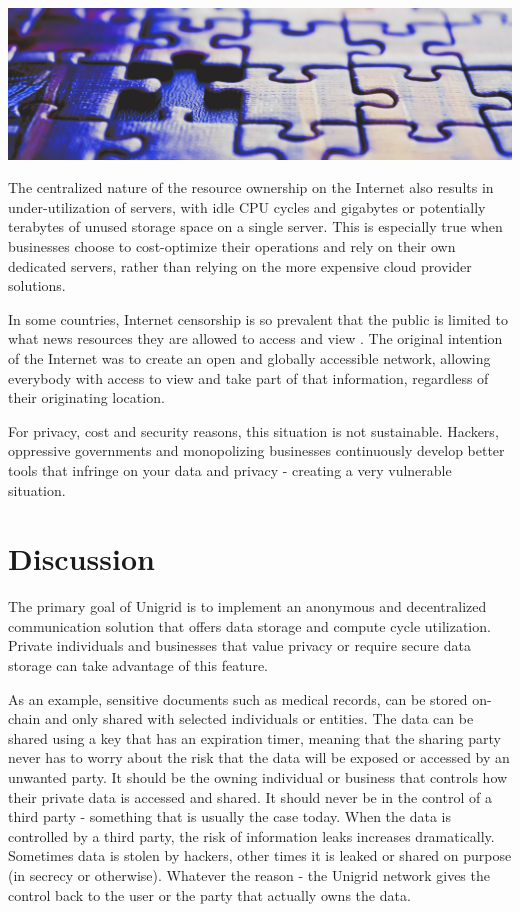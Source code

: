 \documentclass[a4paper,oneside]{article}
\begin{document}
\vspace{0.05cm}
\begin{mdframed}[style=textimage]
	\includegraphics[width=381pt]{puzzle}
\end{mdframed}

\noindent The centralized nature of the resource ownership on the Internet also results in under-utilization of servers, with idle CPU cycles and gigabytes or potentially terabytes of unused storage space on a single server. This is especially true when businesses choose to cost-optimize their operations and rely on their own dedicated servers, rather than relying on the more expensive cloud provider solutions.

In some countries, Internet censorship is so prevalent that the public is limited to what news resources they are allowed to access and view \cite{wiki2021}. The original intention of the Internet was to create an open and globally accessible network, allowing everybody with access to view and take part of that information, regardless of their originating location.

For privacy, cost and security reasons, this situation is not sustainable. Hackers, oppressive governments and monopolizing businesses continuously develop better tools that infringe on your data and privacy - creating a very vulnerable situation.

\section{Discussion}
The primary goal of Unigrid is to implement an anonymous and decentralized communication solution that offers data storage and compute cycle utilization. Private individuals and businesses that value privacy or require secure data storage can take advantage of this feature.

As an example, sensitive documents such as medical records, can be stored on-chain and only shared with selected individuals or entities. The data can be shared using a key that has an expiration timer, meaning that the sharing party never has to worry about the risk that the data will be exposed or accessed by an unwanted party. It should be the owning individual or business that controls how their private data is accessed and shared. It should never be in the control of a third party - something that is usually the case today. When the data is controlled by a third party, the risk of information leaks increases dramatically. Sometimes data is stolen by hackers, other times it is leaked or shared on purpose (in secrecy or otherwise). Whatever the reason - the Unigrid network gives the control back to the user or the party that actually owns the data.
\end{document}
